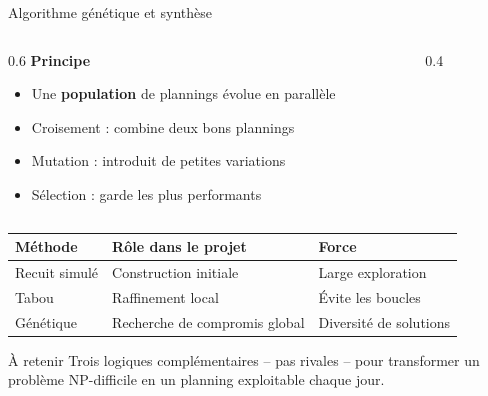 \documentclass[aspectratio=169,11pt]{beamer}
\begin{document}
\begin{frame}{Algorithme génétique et synthèse}
  \begin{columns}[T]
    \begin{column}{0.6\textwidth}
      \small\textbf{Principe}
      \begin{itemize}\itemsep2pt
        \item Une \textbf{population} de plannings évolue en parallèle
        \item Croisement : combine deux bons plannings
        \item Mutation : introduit de petites variations
        \item Sélection : garde les plus performants
      \end{itemize}
    \end{column}
    \begin{column}{0.4\textwidth}
      \centering
    \end{column}
  \end{columns}
  \vspace{2pt}
  \renewcommand{\arraystretch}{0.9}
  \begin{table}
    \centering\scriptsize
    \setlength{\tabcolsep}{4pt}
    \begin{tabular}{lll}
      \toprule
      \textbf{Méthode} & \textbf{Rôle dans le projet} & \textbf{Force} \\
      \midrule
      Recuit simulé & Construction initiale & Large exploration \\
      Tabou & Raffinement local & Évite les boucles \\
      Génétique & Recherche de compromis global & Diversité de solutions \\
      \bottomrule
    \end{tabular}
  \end{table}
  \begin{alertblock}{\footnotesize À retenir}
    \footnotesize Trois logiques complémentaires -- pas rivales -- pour
    transformer un problème NP-difficile en un planning exploitable chaque jour.
  \end{alertblock}
\end{frame}
\end{document}
